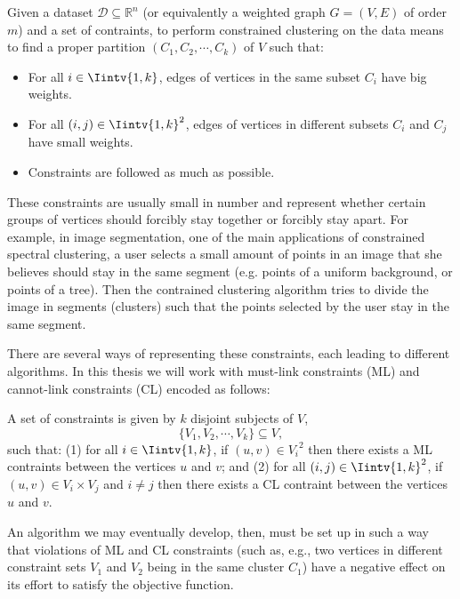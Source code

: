 Given a dataset $\mathcal D \subseteq \mathbb{R}^{n }$ (or equivalently a weighted graph $G = (V,E)$ of order $m$) and a set of contraints, to perform constrained clustering on the data means to find a proper partition $(C_1, C_2, \cdots, C_k)$ of $V$ such that:
\begin{itemize}
   \item For all $i \in \Iintv{1,k}$, edges of vertices in the same subset $C_i$ have big weights.
   \item For all $(i,j) \in \Iintv{1,k}^2$, edges of vertices in different subsets $C_i$ and $C_j$ have small weights.
   \item Constraints are followed as much as possible.
\end{itemize}

These constraints are usually small in number and represent whether certain groups of vertices should forcibly stay together or forcibly stay apart.
For example, in image segmentation, one of the main applications of constrained spectral clustering, a user selects a small amount of points in an image that she believes should stay in the same segment (e.g. points of a uniform background, or points of a tree). Then the contrained clustering algorithm tries to divide the image in segments (clusters) such that the points selected by the user stay in the same segment.


There are several ways of representing these constraints, each leading to different algorithms. 
In this thesis we will work with must-link constraints (ML) and cannot-link constraints (CL) encoded as follows:

A set of constraints is given by $k$ disjoint subjects of $V$,
\begin{equation}
   \{ V_1, V_2, \cdots, V_k \} \subseteq V,
\end{equation}
such that: (1) for all $i \in \Iintv{1,k}$, if $(u,v) \in {V_i}^2$ then there exists a ML contraints between the vertices $u$ and $v$; and (2) for all $(i,j) \in \Iintv{1,k}^2$, if $(u,v) \in V_i \times V_j$ and $i \ne j$ then there exists a CL contraint between the vertices $u$ and $v$. 

An algorithm we may eventually develop, then, must be set up in such a way that violations of ML and CL constraints (such as, e.g., two vertices in different constraint sets $V_1$ and $V_2$ being in the same cluster $C_1$) have a negative effect on its effort to satisfy the objective function.

